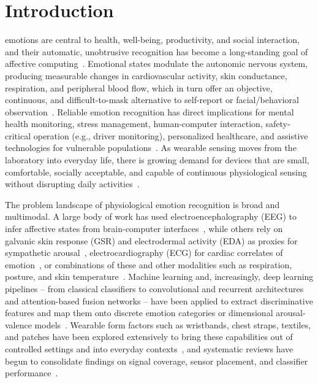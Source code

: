 \section{Introduction}\label{sec:intro}
 emotions are central to health, well-being, productivity, and social interaction, and their automatic, unobtrusive recognition has become a long-standing goal of affective computing~\cite{khare2023emotion}. Emotional states modulate the autonomic nervous system, producing measurable changes in cardiovascular activity, skin conductance, respiration, and peripheral blood flow, which in turn offer an objective, continuous, and difficult-to-mask alternative to self-report or facial/behavioral observation~\cite{lisetti2004noninvasive,houssein2022human}. Reliable emotion recognition has direct implications for mental health monitoring, stress management, human-computer interaction, safety-critical operation (e.g., driver monitoring), personalized healthcare, and assistive technologies for vulnerable populations~\cite{sharma2023emotion,gutierrezmartin2022fear}. As wearable sensing moves from the laboratory into everyday life, there is growing demand for devices that are small, comfortable, socially acceptable, and capable of continuous physiological sensing without disrupting daily activities~\cite{saganowski2022emotion,dias2018wearable}.

The problem landscape of physiological emotion recognition is broad and multimodal. A large body of work has used electroencephalography (EEG) to infer affective states from brain-computer interfaces~\cite{houssein2022human}, while others rely on galvanic skin response (GSR) and electrodermal activity (EDA) as proxies for sympathetic arousal~\cite{ayata2017emotion,damelio2025emotion,diaz2024fractal}, electrocardiography (ECG) for cardiac correlates of emotion~\cite{granados2018deep,dessai2024multimodal}, or combinations of these and other modalities such as respiration, posture, and skin temperature~\cite{liu2018human,song2019mped,jang2015analysis}. Machine learning and, increasingly, deep learning pipelines -- from classical classifiers to convolutional and recurrent architectures and attention-based fusion networks -- have been applied to extract discriminative features and map them onto discrete emotion categories or dimensional arousal-valence models~\cite{granados2018deep,sumanth2025bilstm,zou2024emotion,kwon2018electroencephalography}. Wearable form factors such as wristbands, chest straps, textiles, and patches have been explored extensively to bring these capabilities out of controlled settings and into everyday contexts~\cite{saganowski2022emotion,li2023advanced,dissanayake2022sigrep,li2024comparison}, and systematic reviews have begun to consolidate findings on signal coverage, sensor placement, and classifier performance~\cite{hui2018coverage,c2026survey,bulagang2020review}.

